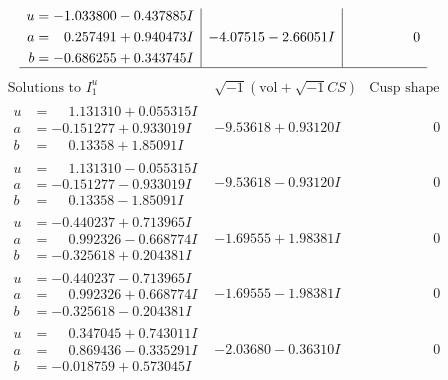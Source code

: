 \documentclass[1p]{elsarticle_modified}
\theoremstyle{definition}
\newcommand{\I}{\sqrt{-1}}
\begin{document}
$$\begin{array}{c|c|c}
\begin{aligned}
u &= -1.033800 - 0.437885 I \\
a &= \phantom{-}0.257491 + 0.940473 I \\
b &= -0.686255 + 0.343745 I\end{aligned}
 & -4.07515 - 2.66051 I & \phantom{-0.000000 } 0\\
 \hline 
 \end{array}$$\newpage$$\begin{array}{c|c|c}  
\text{Solutions to }I^u_{1}& \I (\text{vol} + \sqrt{-1}CS) & \text{Cusp shape}\\
 \hline 
\begin{aligned}
u &= \phantom{-}1.131310 + 0.055315 I \\
a &= -0.151277 + 0.933019 I \\
b &= \phantom{-}0.13358 + 1.85091 I\end{aligned}
 & -9.53618 + 0.93120 I & \phantom{-0.000000 } 0 \\ \hline\begin{aligned}
u &= \phantom{-}1.131310 - 0.055315 I \\
a &= -0.151277 - 0.933019 I \\
b &= \phantom{-}0.13358 - 1.85091 I\end{aligned}
 & -9.53618 - 0.93120 I & \phantom{-0.000000 } 0 \\ \hline\begin{aligned}
u &= -0.440237 + 0.713965 I \\
a &= \phantom{-}0.992326 - 0.668774 I \\
b &= -0.325618 + 0.204381 I\end{aligned}
 & -1.69555 + 1.98381 I & \phantom{-0.000000 } 0 \\ \hline\begin{aligned}
u &= -0.440237 - 0.713965 I \\
a &= \phantom{-}0.992326 + 0.668774 I \\
b &= -0.325618 - 0.204381 I\end{aligned}
 & -1.69555 - 1.98381 I & \phantom{-0.000000 } 0 \\ \hline\begin{aligned}
u &= \phantom{-}0.347045 + 0.743011 I \\
a &= \phantom{-}0.869436 - 0.335291 I \\
b &= -0.018759 + 0.573045 I\end{aligned}
 & -2.03680 - 0.36310 I & \phantom{-0.000000 } 0 \\ \hline\begin{aligned}

\end{aligned}
\end{array}$$
\end{document}
